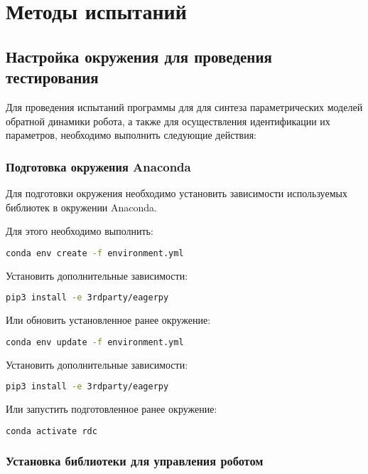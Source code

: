 \newpage
\section{Методы испытаний}

\subsection{Настройка окружения для проведения тестирования} \label{reqtest:setup}
Для проведения испытаний программы \productname для для синтеза параметрических моделей обратной динамики робота, а также для осуществления идентификации их параметров, необходимо выполнить следующие действия:


\subsubsection{Подготовка окружения Anaconda}

Для подготовки окружения необходимо установить зависимости используемых библиотек в окружении Anaconda.

Для этого необходимо выполнить:
\begin{lstlisting}[language=bash, numbers=none, frame=single]
    conda env create -f environment.yml
\end{lstlisting}

Установить дополнительные зависимости:
\begin{lstlisting}[language=bash, numbers=none, frame=single]
    pip3 install -e 3rdparty/eagerpy
\end{lstlisting}

Или обновить установленное ранее окружение:
\begin{lstlisting}[language=bash, numbers=none, frame=single]
    conda env update -f environment.yml
\end{lstlisting}

Установить дополнительные зависимости:
\begin{lstlisting}[language=bash, numbers=none, frame=single]
    pip3 install -e 3rdparty/eagerpy
\end{lstlisting}

Или запустить подготовленное ранее окружение:
\begin{lstlisting}[language=bash, numbers=none, frame=single]
    conda activate rdc
\end{lstlisting}

\subsubsection{Установка библиотеки для управления роботом}

